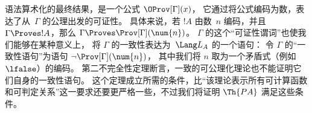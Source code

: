 \documentclass[../../../include/open-logic-section]{subfiles}
\begin{document}
语法算术化的最终结果，是一个公式 $\OProv[\Gamma](x)$，
它通过将公式编码为数，表达了从~$\Gamma$ 的公理出发的可证性。
具体来说，若 $!A$ 由数~$n$ 编码，并且 $\Gamma \Proves !A$，那么 $\Gamma \Proves \Prov[\Gamma](\num{n})$。
$\Gamma$ 的这个“可证性谓词”也使我们能够在某种意义上，
将 $\Gamma$ 的一致性表达为~$\Lang L_A$ 的一个语句：
令 $\Gamma$ 的“一致性语句”为语句 $\lnot \Prov[\Gamma](\num{n})$，
其中我们将 $n$ 取为一个矛盾式（例如~$\lfalse$）的编码。
第二不完全性定理断言，一致的可公理化理论也不能证明它们自身的一致性语句。
这个定理成立所需的条件，比“该理论表示所有可计算函数和可判定关系”这一要求还要更严格一些，不过我们将证明 $\Th{PA}$ 满足这些条件。
\end{document}
